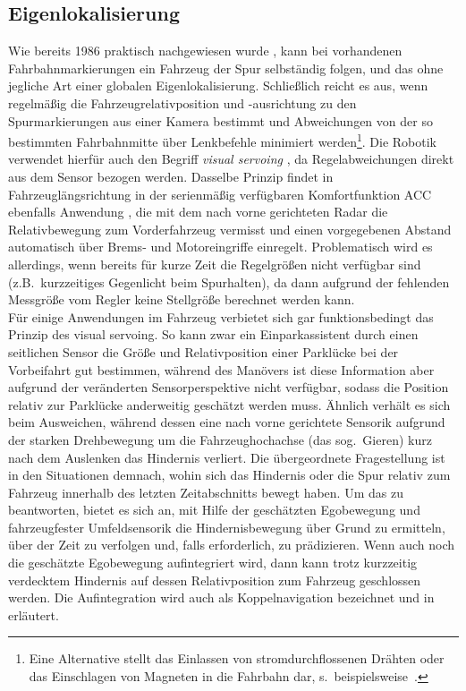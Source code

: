 \subsection{Eigenlokalisierung}
Wie bereits 1986 praktisch nachgewiesen wurde \cite{dickmans1989sod}, kann bei vorhandenen Fahrbahnmarkierungen ein Fahrzeug der Spur selbständig folgen, und das ohne jegliche Art einer globalen Eigenlokalisierung. Schließlich reicht es aus, wenn regelmäßig die Fahrzeugrelativposition und -ausrichtung zu den Spurmarkierungen aus einer Kamera bestimmt und Abweichungen von der so bestimmten Fahrbahnmitte über Lenkbefehle minimiert werden\footnote{Eine Alternative stellt das Einlassen von stromdurchflossenen Drähten oder das Einschlagen von Magneten in die Fahrbahn dar, s.\ beispielsweise\ \cite{markgraf2002autonomes, tan1999development}.}. Die Robotik verwendet hierfür auch den Begriff \emph{visual servoing} \cite{allen1991real}, da Regelabweichungen direkt aus dem Sensor bezogen werden. Dasselbe Prinzip findet in Fahrzeuglängsrichtung in der serienmäßig verfügbaren Komfortfunktion ACC ebenfalls Anwendung \cite{venhovens2000stop}, die mit dem nach vorne gerichteten Radar die Relativbewegung zum Vorderfahrzeug vermisst und einen vorgegebenen Abstand automatisch über Brems- und Motoreingriffe einregelt. Problematisch wird es allerdings, wenn bereits für kurze Zeit die Regelgrößen nicht verfügbar sind (z.B.\ kurzzeitiges Gegenlicht beim Spurhalten), da dann aufgrund der fehlenden Messgröße vom Regler keine Stellgröße berechnet werden kann. \\
Für einige Anwendungen im Fahrzeug verbietet sich gar funktionsbedingt das Prinzip des visual servoing. So kann zwar ein Einparkassistent durch einen  seitlichen Sensor die Größe und Relativposition einer Parklücke bei der Vorbeifahrt gut bestimmen, während des Manövers ist diese Information aber aufgrund der veränderten Sensorperspektive nicht verfügbar, sodass die Position relativ zur Parklücke anderweitig geschätzt werden muss. Ähnlich verhält es sich beim Ausweichen, während dessen eine nach vorne gerichtete Sensorik aufgrund der starken Drehbewegung um die Fahrzeughochachse (das sog.\ Gieren) kurz nach dem Auslenken das Hindernis verliert. Die übergeordnete Fragestellung ist in den Situationen demnach, wohin sich das Hindernis oder die Spur relativ zum Fahrzeug innerhalb des letzten Zeitabschnitts bewegt haben. Um das zu beantworten, bietet es sich an, mit Hilfe der geschätzten Egobewegung und fahrzeugfester Umfeldsensorik die Hindernisbewegung über Grund zu ermitteln, über der Zeit zu verfolgen \cite{maurer2005fahrerassistenzsysteme} und, falls erforderlich, zu prädizieren. Wenn auch noch die geschätzte Egobewegung aufintegriert wird, dann kann trotz kurzzeitig verdecktem Hindernis auf dessen Relativposition zum Fahrzeug geschlossen werden. Die Aufintegration wird auch als Koppelnavigation bezeichnet und in  erläutert. \\

